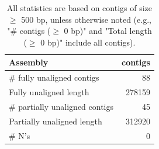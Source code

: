 \documentclass[12pt,a4paper]{article}
\begin{document}
\begin{table}[ht]
\begin{center}
\caption{All statistics are based on contigs of size $\geq$ 500 bp, unless otherwise noted (e.g., "\# contigs ($\geq$ 0 bp)" and "Total length ($\geq$ 0 bp)" include all contigs).}
\begin{tabular}{|l*{1}{|r}|}
\hline
Assembly & contigs \\ \hline
\# fully unaligned contigs & 88 \\ \hline
Fully unaligned length & 278159 \\ \hline
\# partially unaligned contigs & 45 \\ \hline
Partially unaligned length & 312920 \\ \hline
\# N's & 0 \\ \hline
\end{tabular}
\end{center}
\end{table}
\end{document}
